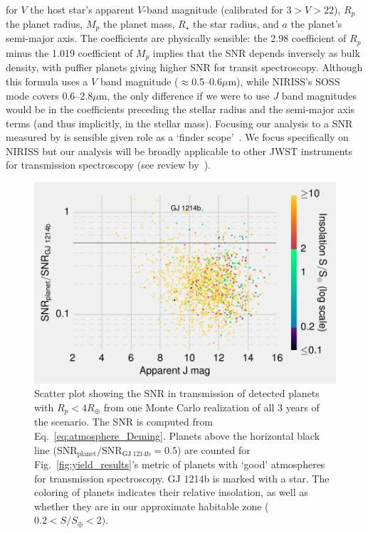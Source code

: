 \begin{enumerate}
\begin{align*}
	\label{eq:atmosphere_Deming}
	\end{align*}
	for $V$ the host star's apparent $V$-band magnitude (calibrated for $3>V>22$), $R_p$ the planet radius, $M_p$ the planet mass, $R_\star$ the star radius, and $a$ the planet's semi-major axis.
	The coefficients are physically sensible: the 2.98 coefficient of $R_p$ minus the 1.019 coefficient of $M_p$ implies that the SNR depends inversely as bulk density, with puffier planets giving higher SNR for transit spectroscopy.
	Although this formula uses a $V$ band magnitude ($\approx$0.5--0.6$\mu$m), while NIRISS's SOSS mode covers 0.6--2.8$\mu$m, the only difference if we were to use $J$ band magnitudes would be in the coefficients preceding the stellar radius and the semi-major axis terms (and thus implicitly, in the stellar mass).
	Focusing our analysis to a SNR measured by \jwst is sensible given \tesss role as a `\jwst finder scope'~\citep{deming_jwst_tess_2009}.
	We focus specifically on NIRISS but our analysis will be broadly applicable 
	to other JWST instruments for transmission 
	spectroscopy (see review by~\citet{beichman_observations_2014}).
	\begin{figure}[!t]
		\centering
		\includegraphics[]{figures/SNR_in_transmission.pdf}
		\caption{ Scatter plot showing the SNR in transmission of detected planets with $R_p<4R_\oplus$ from one Monte Carlo realization of all 3 years of the \npole\:scenario.
			The SNR is computed from Eq.~\protect\ref{eq:atmosphere_Deming}.
			Planets above the horizontal black line ($\mathrm{SNR_{planet}/SNR_{GJ\ 1214b}} = 0.5$) are counted for Fig.~\protect\ref{fig:yield_results}'s metric of planets with `good' atmospheres for transmission spectroscopy.
			GJ 1214b is marked with a star.
			The coloring of planets indicates their relative insolation, as well as 
			whether they are in our approximate habitable zone ($0.2<S/S_\oplus<2)$.
		}
		\label{fig:atmosphere_scatter}
	\end{figure}


\end{enumerate}
